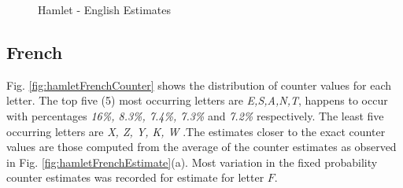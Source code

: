 \documentclass[longpaper, english, final, times]{revdetua}
\begin{document}
			\begin{figure}
				\caption{Hamlet - English Estimates}
				\begin{center}
				\end{center}
				\label{fig:hamletEnglishEstimate}
			\end{figure}

		\subsection{French}
			Fig. \ref{fig:hamletFrenchCounter} shows the distribution of counter values for each letter. The top five (5) most occurring letters are \textit{E,S,A,N,T}, happens to occur with percentages \textit{16\%, 8.3\%, 7.4\%, 7.3\%} and  \textit{7.2\%} respectively. The least five occurring letters are \textit{X, Z, Y, K, W} .The estimates closer to the exact counter values are those computed from the average of the counter estimates as observed in Fig. \ref{fig:hamletFrenchEstimate}(a). Most variation in the fixed probability counter estimates was recorded for estimate for letter $F$.
			
\end{document}
